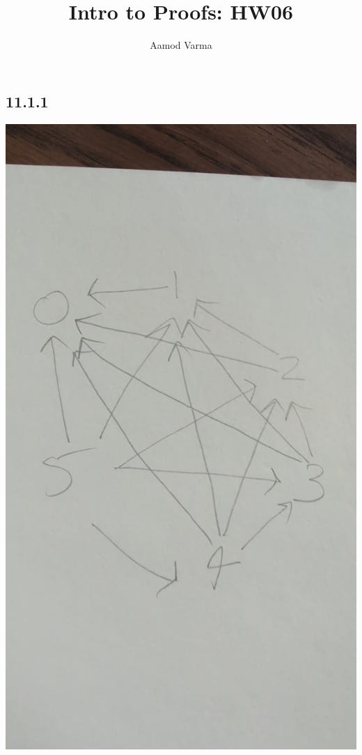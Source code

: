 \documentclass[a4paper]{report}
\title{Intro to Proofs: HW06}
\author{Aamod Varma}
\begin{document}
\maketitle
\date{}
    
\subsection*{11.1.1}
    
\includegraphics[scale=.2]{Untitled}
\end{document}
